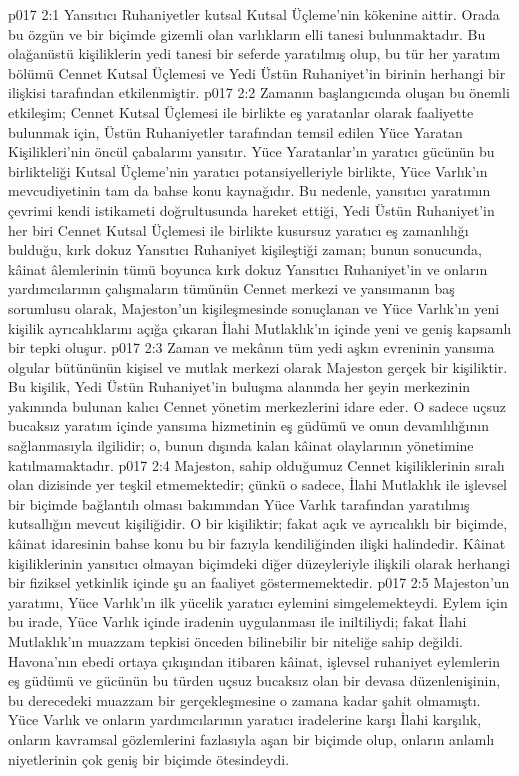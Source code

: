 \vs p017 2:1 Yansıtıcı Ruhaniyetler kutsal Kutsal Üçleme’nin kökenine aittir. Orada bu özgün ve bir biçimde gizemli olan varlıkların elli tanesi bulunmaktadır. Bu olağanüstü kişiliklerin yedi tanesi bir seferde yaratılmış olup, bu tür her yaratım bölümü Cennet Kutsal Üçlemesi ve Yedi Üstün Ruhaniyet’in birinin herhangi bir ilişkisi tarafından etkilenmiştir.
\vs p017 2:2 Zamanın başlangıcında oluşan bu önemli etkileşim; Cennet Kutsal Üçlemesi ile birlikte eş yaratanlar olarak faaliyette bulunmak için, Üstün Ruhaniyetler tarafından temsil edilen Yüce Yaratan Kişilikleri’nin öncül çabalarını yansıtır. Yüce Yaratanlar’ın yaratıcı gücünün bu birlikteliği Kutsal Üçleme’nin yaratıcı potansiyelleriyle birlikte, Yüce Varlık’ın mevcudiyetinin tam da bahse konu kaynağıdır. Bu nedenle, yansıtıcı yaratımın çevrimi kendi istikameti doğrultusunda hareket ettiği, Yedi Üstün Ruhaniyet’in her biri Cennet Kutsal Üçlemesi ile birlikte kusursuz yaratıcı eş zamanlılığı bulduğu, kırk dokuz Yansıtıcı Ruhaniyet kişileştiği zaman; bunun sonucunda, kâinat âlemlerinin tümü boyunca kırk dokuz Yansıtıcı Ruhaniyet’in ve onların yardımcılarının çalışmaların tümünün Cennet merkezi ve yansımanın baş sorumlusu olarak, Majeston’un kişileşmesinde sonuçlanan ve Yüce Varlık’ın yeni kişilik ayrıcalıklarını açığa çıkaran İlahi Mutlaklık’ın içinde yeni ve geniş kapsamlı bir tepki oluşur.
\vs p017 2:3 Zaman ve mekânın tüm yedi aşkın evreninin yansıma olgular bütününün kişisel ve mutlak merkezi olarak Majeston gerçek bir kişiliktir. Bu kişilik, Yedi Üstün Ruhaniyet’in buluşma alanında her şeyin merkezinin yakınında bulunan kalıcı Cennet yönetim merkezlerini idare eder. O sadece uçsuz bucaksız yaratım içinde yansıma hizmetinin eş güdümü ve onun devamlılığının sağlanmasıyla ilgilidir; o, bunun dışında kalan kâinat olaylarının yönetimine katılmamaktadır.
\vs p017 2:4 Majeston, sahip olduğumuz Cennet kişiliklerinin sıralı olan dizisinde yer teşkil etmemektedir; çünkü o sadece, İlahi Mutlaklık ile işlevsel bir biçimde bağlantılı olması bakımından Yüce Varlık tarafından yaratılmış kutsallığın mevcut kişiliğidir. O bir kişiliktir; fakat açık ve ayrıcalıklı bir biçimde, kâinat idaresinin bahse konu bu bir fazıyla kendiliğinden ilişki halindedir. Kâinat kişiliklerinin yansıtıcı olmayan biçimdeki diğer düzeyleriyle ilişkili olarak herhangi bir fiziksel yetkinlik içinde şu an faaliyet göstermemektedir.
\vs p017 2:5 Majeston’un yaratımı, Yüce Varlık’ın ilk yücelik yaratıcı eylemini simgelemekteydi. Eylem için bu irade, Yüce Varlık içinde iradenin uygulanması ile iniltiliydi; fakat İlahi Mutlaklık’ın muazzam tepkisi önceden bilinebilir bir niteliğe sahip değildi. Havona’nın ebedi ortaya çıkışından itibaren kâinat, işlevsel ruhaniyet eylemlerin eş güdümü ve gücünün bu türden uçsuz bucaksız olan bir devasa düzenlenişinin, bu derecedeki muazzam bir gerçekleşmesine o zamana kadar şahit olmamıştı. Yüce Varlık ve onların yardımcılarının yaratıcı iradelerine karşı İlahi karşılık, onların kavramsal gözlemlerini fazlasıyla aşan bir biçimde olup, onların anlamlı niyetlerinin çok geniş bir biçimde ötesindeydi.
